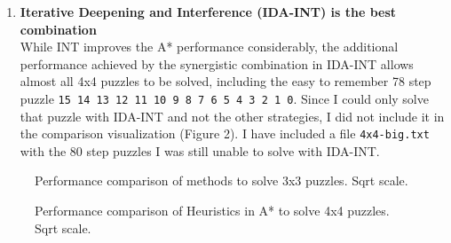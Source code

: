 \documentclass{article}
\newcommand\bitem[1]{\item{\bfseries #1}\\}
\begin{document}
\begin{enumerate}
	        \bitem{Iterative Deepening and Interference (IDA-INT) is the best combination}
	While INT improves the A* performance considerably, the additional performance achieved by the synergistic combination in IDA-INT allows almost all 4x4 puzzles to be solved, including the easy to remember 78 step puzzle \texttt{15 14 13 12 11 10 9 8 7 6 5 4 3 2 1 0}.  Since I could only solve that puzzle with IDA-INT and not the other strategies, I did not include it in the comparison visualization (Figure 2).  I have included a file \texttt{4x4-big.txt} with the 80 step puzzles I was still unable to solve with IDA-INT.
	    \end{enumerate}
	\begin{figure}
		\centering
		
		
		
		
		\caption{Performance comparison of methods to solve 3x3 puzzles.  Sqrt scale.}
		\label{figure-1}
	\end{figure}
	\begin{figure}
		\centering
		
		
		
		
		\caption{Performance comparison of Heuristics in A* to solve 4x4 puzzles.  Sqrt scale.}
		\label{figure-2}
	\end{figure}
\end{document}

